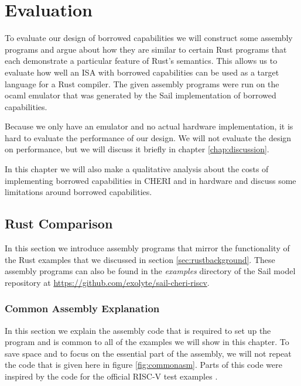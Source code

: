 \chapter{Evaluation}
\label{chap:evaluation}
To evaluate our design of borrowed capabilities we will construct some assembly programs and argue about how they are similar to certain Rust programs that each demonstrate a particular feature of Rust's semantics.
This allows us to evaluate how well an ISA with borrowed capabilities can be used as a target language for a Rust compiler.
The given assembly programs were run on the ocaml emulator that was generated by the Sail implementation of borrowed capabilities.

Because we only have an emulator and no actual hardware implementation, it is hard to evaluate the performance of our design.
We will not evaluate the design on performance, but we will discuss it briefly in chapter \ref{chap:discussion}.

In this chapter we will also make a qualitative analysis about the costs of implementing borrowed capabilities in CHERI and in hardware and discuss some limitations around borrowed capabilities.

\section{Rust Comparison}
\label{sec:rustexampleseval}
In this section we introduce assembly programs that mirror the functionality of the Rust examples that we discussed in section \ref{sec:rustbackground}.
These assembly programs can also be found in the \textit{examples} directory of the Sail model repository at \url{https://github.com/exolyte/sail-cheri-riscv}.

\subsection{Common Assembly Explanation}
In this section we explain the assembly code that is required to set up the program and is common to all of the examples we will show in this chapter.
To save space and to focus on the essential part of the assembly, we will not repeat the code that is given here in figure \ref{fig:commonasm}.
Parts of this code were inspired by the code for the official RISC-V test examples \cite{riscvtest}.

